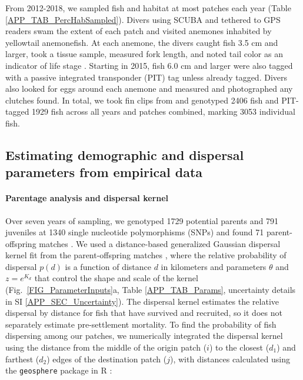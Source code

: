 \documentclass[12pt, oneside]{article}   	%
\begin{document}
From 2012-2018, we sampled fish and habitat at most patches each year (Table \ref{APP_TAB_PercHabSampled}). Divers using SCUBA and tethered to GPS readers swam the extent of each patch and visited anemones inhabited by yellowtail anemonefish. At each anemone, the divers caught fish 3.5 cm and larger, took a tissue sample, measured fork length, and noted tail color as an indicator of life stage \citep{moyer1976geographical}. Starting in 2015, fish 6.0 cm and larger were also tagged with a passive integrated transponder (PIT) tag unless already tagged. Divers also looked for eggs around each anemone and measured and photographed any clutches found. In total, we took fin clips from and genotyped 2406 fish and PIT-tagged 1929 fish across all years and patches combined, marking 3053 individual fish. %

\subsection*{Estimating demographic and dispersal parameters from empirical data} 

\paragraph*{Parentage analysis and dispersal kernel}  %

Over seven years of sampling, we genotyped 1729 potential parents and 791 juveniles at 1340 single nucleotide polymorphisms (SNPs) and found 71 parent-offspring matches \citep{catalanoInPrepconnectivity}. We used a distance-based generalized Gaussian dispersal kernel fit from the parent-offspring matches \citep{catalanoInPrepconnectivity, bode2018estimating}, where the relative probability of dispersal $p(d)$ is a function of distance $d$ in kilometers and parameters $\theta$ and $z = e^{K_d}$ that control the shape and scale of the kernel (Fig.\ \ref{FIG_ParameterInputs}a, Table \ref{APP_TAB_Params}, uncertainty details in SI \ref{APP_SEC_Uncertainty}). The dispersal kernel estimates the relative dispersal by distance for fish that have survived and recruited, so it does not separately estimate pre-settlement mortality. To find the probability of fish dispersing among our patches, we numerically integrated the dispersal kernel using the distance from the middle of the origin patch ($i$) to the closest ($d_1$) and farthest ($d_2$) edges of the destination patch ($j$), with distances calculated using the \texttt{geosphere} package in R \citep{geosphere2017R}:
\end{document}
